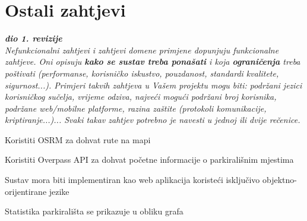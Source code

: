 		\section{Ostali zahtjevi}
		
			\textbf{\textit{dio 1. revizije}}\\
		 
			 \textit{Nefunkcionalni zahtjevi i zahtjevi domene primjene dopunjuju funkcionalne zahtjeve. Oni opisuju \textbf{kako se sustav treba ponašati} i koja \textbf{ograničenja} treba poštivati (performanse, korisničko iskustvo, pouzdanost, standardi kvalitete, sigurnost...). Primjeri takvih zahtjeva u Vašem projektu mogu biti: podržani jezici korisničkog sučelja, vrijeme odziva, najveći mogući podržani broj korisnika, podržane web/mobilne platforme, razina zaštite (protokoli komunikacije, kriptiranje...)... Svaki takav zahtjev potrebno je navesti u jednoj ili dvije rečenice.}
			 \begin{packed_enum}

				\item Koristiti OSRM za dohvat rute na mapi
				\item Koristiti Overpass API za dohvat početne informacije o parkirališnim mjestima
				\item Sustav mora biti implementiran kao web aplikacija koristeći isključivo objektno-orijentirane jezike
				\item Statistika parkirališta se prikazuje u obliku grafa
				
			 \end{packed_enum}
			 
			 